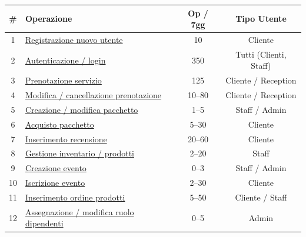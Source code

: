 \documentclass[a4paper,12pt]{report}
\begin{document}
\begin{table}[H]
	\centering
	\small
	\renewcommand{\arraystretch}{1.12}
	\begin{tabularx}{\textwidth}{|c|>{\raggedright\arraybackslash}X|c|c|}
		\hline
		\rowcolor{gray!20}
		\textbf{\#} & \textbf{Operazione}                                                    & \textbf{Op / 7gg} & \textbf{Tipo Utente}   \\
		\hline
		1           & \hyperref[op1]{Registrazione nuovo utente}                             & 10             & Cliente                \\
		\hline
		2           & \hyperref[op2]{Autenticazione / login}                                 & 350          & Tutti (Clienti, Staff) \\
		\hline
		3           & \hyperref[op3]{Prenotazione servizio}                                  & 125           & Cliente / Reception    \\
		\hline
		4           & \hyperref[op4]{Modifica / cancellazione prenotazione}                  & 10--80            & Cliente / Reception    \\
		\hline
		5           & \hyperref[op5]{Creazione / modifica pacchetto}                         & 1--5              & Staff / Admin          \\
		\hline
		6           & \hyperref[op6]{Acquisto pacchetto}                                     & 5--30             & Cliente                \\
		\hline
		7           & \hyperref[op7]{Inserimento recensione}                                 & 20--60            & Cliente                \\
		\hline
		8           & \hyperref[op8]{Gestione inventario / prodotti}                         & 2--20             & Staff                  \\
		\hline
		9           & \hyperref[op9]{Creazione evento}                                       & 0--3              & Staff / Admin          \\
		\hline
		10          & \hyperref[op10]{Iscrizione evento}                                     & 2--30             & Cliente                \\
		\hline
		11          & \hyperref[op11]{Inserimento ordine prodotti}                           & 5--50             & Cliente / Staff        \\
		\hline
		12          & \hyperref[op12]{Assegnazione / modifica ruolo dipendenti}              & 0--5              & Admin                  \\

\end{tabularx}
\end{table}
\end{document}
